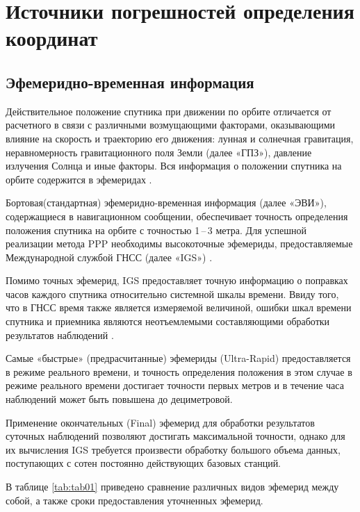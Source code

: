\section{Источники погрешностей определения координат}\label{sec:ch1/sec3}

\subsection{Эфемеридно-временная информация}\label{subsec:ch1/sec3/sub1}

Действительное положение спутника при движении по орбите отличается от расчетного в связи с различными возмущающими факторами, оказывающими влияние на скорость и траекторию его движения: лунная и солнечная гравитация, неравномерность гравитационного поля Земли (далее «ГПЗ»), давление излучения Солнца и иные факторы. Вся информация о положении спутника на орбите содержится в эфемеридах \cite{src08,src18,src33}.

Бортовая(стандартная) эфемеридно-временная информация (далее «ЭВИ»), содержащиеся в навигационном сообщении, обеспечивает точность определения положения спутника на орбите с точностью 1\,--\,3 метра. Для успешной реализации метода PPP необходимы высокоточные эфемериды, предоставляемые Международной службой ГНСС (далее «IGS») \cite{src32}.

Помимо точных эфемерид, IGS предоставляет точную информацию о поправках часов каждого спутника относительно системной шкалы времени. Ввиду того, что в ГНСС время также является измеряемой величиной, ошибки шкал времени спутника и приемника являются неотъемлемыми составляющими обработки результатов наблюдений \cite{src35}.

Самые «быстрые» (предрасчитанные) эфемериды (Ultra-Rapid) предоставляется в режиме реального времени, и точность определения положения в этом случае в режиме реального времени достигает точности первых метров и в течение часа наблюдений может быть повышена до дециметровой.

Применение окончательных (Final) эфемерид для обработки результатов суточных наблюдений позволяют достигать максимальной точности, однако для их вычисления IGS требуется произвести обработку большого объема данных, поступающих с сотен постоянно действующих базовых станций.

В таблице \cref{tab:tab01} приведено сравнение различных видов эфемерид между собой, а также сроки предоставления уточненных эфемерид.

